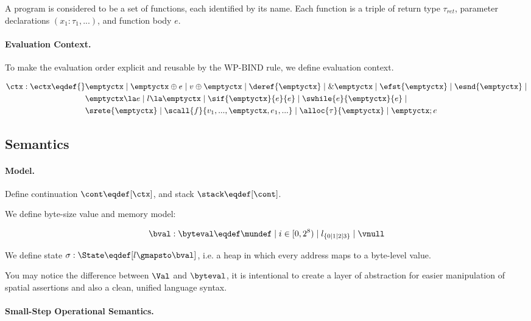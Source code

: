 A program is considered to be a set of functions, each identified by its name. Each
function is a triple of return type $\tau_{ret}$, parameter declarations $(x_1 : \tau_1, ...)$,
and function body $e$.

\paragraph{Evaluation Context.}

To make the evaluation order explicit and reusable by the $\text{WP-BIND}$ rule, we define evaluation context.

\begin{align*}
    \ctx : \ectx \eqdef{}&
        \emptyctx \mid \emptyctx \oplus e \mid v \oplus \emptyctx \mid
        \deref{\emptyctx} \mid \& \emptyctx \mid
        \efst{\emptyctx} \mid \esnd{\emptyctx} \mid \\&
        \emptyctx \la e \mid l \la \emptyctx \mid \sif{\emptyctx}{e}{e} \mid \swhile{e}{\emptyctx}{e} \mid \\&
        \srete{\emptyctx} \mid \scall{f}{v_1, ..., \emptyctx, e_1, ...} \mid \alloc{\tau}{\emptyctx} \mid \emptyctx ; e
\end{align*}

\subsection{Semantics}
\paragraph{Model.}

Define continuation $\cont \eqdef [\ctx]$, and stack $\stack \eqdef [\cont]$.

We define byte-size value and memory model:

\[\bval : \byteval \eqdef \mundef \mid i \in [0, 2^8) \mid l_{\{0 \mid 1 \mid 2 \mid 3\}} \mid \vnull\]

We define state $\sigma: \State \eqdef [ l \gmapsto \bval ]$,
i.e. a heap in which every address maps to a byte-level value.

You may notice the difference between $\Val$ and $\byteval$, it is intentional to create a layer of abstraction for
easier manipulation of spatial assertions and also a clean, unified language syntax.

\paragraph{Small-Step Operational Semantics.}

